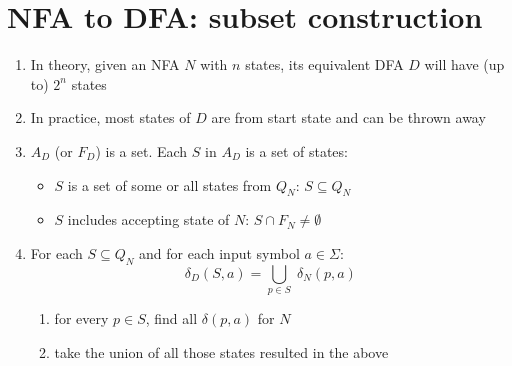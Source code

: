 \section*{NFA to DFA: subset construction}
\begin{enumerate}
\item In theory, given an NFA $N$ with $n$ states, its equivalent DFA $D$ will have (up to) $2^{n}$ states
\item In practice, most states of $D$ are  from start state and can be thrown away
\item $A_{D}$ (or $F_{D}$) is a set. Each $S$ in $A_{D}$ is a set of states:
  \begin{itemize}
  \item $S$ is a set of some or all states from $Q_{N}$: $S \subseteq Q_{N}$
  \item $S$ includes  accepting state of $N$: $S \cap F_{N} \neq \emptyset$
  \end{itemize}
\item For each $S \subseteq Q_{N}$ and for each input symbol $a \in \Sigma$:
  \begin{equation*}
    \delta_{D}(S,a) = \bigcup_{p \in S}\;\delta_{N}(p,a)
  \end{equation*}
  \begin{enumerate}[label={\alph*.}]
  \item for every $p \in S$, find all $\delta(p,a)$ for $N$
  \item take the union of all those states resulted in the above
  \end{enumerate}
\end{enumerate}


